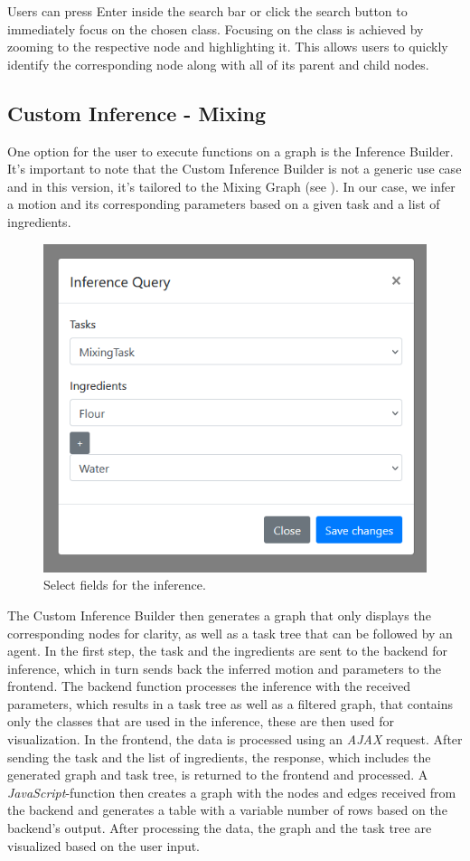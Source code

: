 Users can press Enter inside the search bar or click the search button to immediately focus on the chosen class. 
Focusing on the class is achieved by zooming to the respective node and highlighting it. 
This allows users to quickly identify the corresponding node along with all of its parent and child nodes.

\subsection{Custom Inference - Mixing}

One option for the user to execute functions on a graph is the Inference Builder. 
It's important to note that the Custom Inference Builder is not a generic use case and in this version, it's tailored to the Mixing Graph (see ). 
In our case, we infer a motion and its corresponding parameters based on a given task and a list of ingredients. 
\begin{figure}[H]
    \includegraphics[scale=0.45]{Graphics/inference_user_input.png}
    \caption{Select fields for the inference.}
\end{figure}
The Custom Inference Builder then generates a graph that only displays the corresponding nodes for clarity, as well as a task tree that can be followed by an agent.
In the first step, the task and the ingredients are sent to the backend for inference, which in turn sends back the inferred motion and parameters to the frontend.
The backend function processes the inference with the received parameters, which results in a task tree as well as a filtered graph, that contains only the classes that are used in the inference, these are then used for visualization.
In the frontend, the data is processed using an \textit{AJAX} request. After sending the task and the list of ingredients, the response, which includes the generated graph and task tree, is returned to the frontend and processed. A \textit{JavaScript}-function then creates a graph with the nodes and edges received from the backend and generates a table with a variable number of rows based on the backend's output.
After processing the data, the graph and the task tree are visualized based on the user input.

